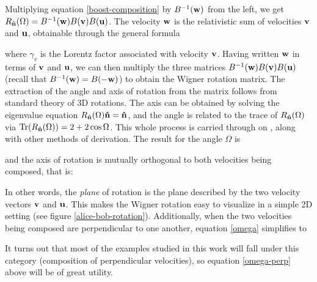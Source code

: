 \documentclass[12pt,a4paper,notitlepage]{report}
\begin{document}
Multiplying equation \eqref{boost-composition} by $B^{-1}(\vb{w})$ from the left, we get $R_{\vu{n}}(\Omega) = B^{-1}(\vb{w})B(\vb{v})B(\vb{u})$. The velocity $\vb{w}$ is the relativistic sum of velocities $\vb{v}$ and $\vb{u}$, obtainable through the general formula

%
where $\gamma_v$ is the Lorentz factor associated with velocity $\vb{v}$. Having written $\vb{w}$ in terms of $\vb{v}$ and $\vb{u}$, we can then multiply the three matrices $B^{-1}(\vb{w})B(\vb{v})B(\vb{u})$ (recall that $B^{-1}(\vb{w}) = B(-\vb{w})$) to obtain the Wigner rotation matrix. The extraction of the angle and axis of rotation from the matrix follows from standard theory of 3D rotations. The axis can be obtained by solving the eigenvalue equation $R_{\vu{n}}(\Omega)\vu{n} = \vu{n}$, and the angle is related to the trace of $R_{\vu{n}}(\Omega)$ via $\Tr(R_{\vu{n}}(\Omega)) = 2 + 2\cos\Omega$. This whole process is carried through on \cite{visser_2011}, along with other methods of derivation. The result for the angle $\Omega$ is

%
and the axis of rotation is mutually orthogonal to both velocities being composed, that is:

%
In other words, the {\it plane} of rotation is the plane described by the two velocity vectors $\vb{v}$ and $\vb{u}$. This makes the Wigner rotation easy to visualize in a simple 2D setting (see figure \ref{alice-bob-rotation}). Additionally, when the two velocities being composed are perpendicular to one another, equation \eqref{omega} simplifies to

%
It turns out that most of the examples studied in this work will fall under this category (composition of perpendicular velocities), so equation \eqref{omega-perp} above will be of great utility.
\end{document}
